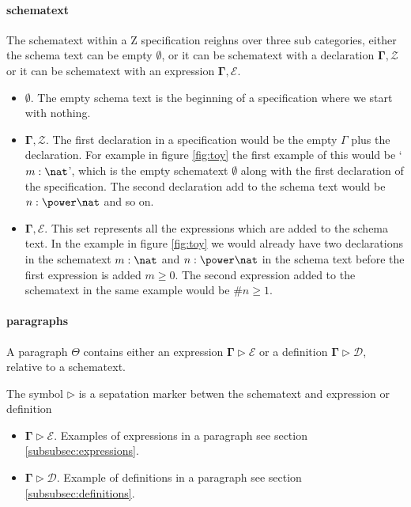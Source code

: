 \paragraph{schematext}
\label{subsubsec:schematext}

The schematext within a Z specification reighns over three sub categories, either the schema text can be empty $\emptyset$, or it can be schematext with a declaration $\mathbf{\Gamma}, \mathcal{Z}$ or it can be schematext with an expression $\mathbf{\Gamma}, \mathcal{E}$.

\begin{itemize}
\item $\emptyset$. The empty schema text is the beginning of a specification where we start with nothing.

\item $\mathbf{\Gamma}, \mathcal{Z}$. The first declaration in a specification would be the empty $\Gamma$ plus the declaration. For example in figure \ref{fig:toy} the first example of this would be `$m:\nat$', which is the empty schematext $\emptyset$ along with the first declaration of the specification. The second declaration add to the schema text would be $n:\power \nat$ and so on.

\item $\mathbf{\Gamma}, \mathcal{E}$. This set represents all the expressions which are added to the schema text. In the example in figure \ref{fig:toy} we would already have two declarations in the schematext $m:\nat$ and $n:\power \nat$ in the schema text before the first expression is added $m \geq 0$. The second expression added to the schematext in the same example would be $\# n \geq 1$. 

\end{itemize}

\paragraph{paragraphs}
\label{subsubsec:paragraphs}

A paragraph $\Theta$ contains either an expression $\mathbf{\Gamma} \triangleright \mathcal{E}$ or a definition $\mathbf{\Gamma} \triangleright \mathcal{D}$, relative to a schematext.

The symbol $\triangleright$ is a sepatation marker betwen the schematext and expression or definition

\begin{itemize}
\item $\mathbf{\Gamma} \triangleright \mathcal{E}$. Examples of expressions in a paragraph see section \ref{subsubsec:expressions}.

\item $\mathbf{\Gamma} \triangleright \mathcal{D}$. Example of definitions in a paragraph see section \ref{subsubsec:definitions}.
\end{itemize}

